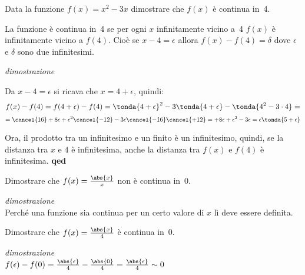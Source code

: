 \begin{esempio}
 Data la funzione \(f(x)=x^2-3x\) dimostrare che \(f(x)\) è continua in~4.
 
 La funzione è continua in~4 se per ogni \(x\) infinitamente vicino a~4 
 \(f(x)\) è infinitamente vicino a \(f(4)\). Cioè se \(x -4=\epsilon\) allora
 \(f(x) -f(4) = \delta\) dove \(\epsilon\) e \(\delta\) sono due infinitesimi.
 
\emph{dimostrazione}

Da \(x-4=\epsilon\) si ricava che \(x=4+\epsilon\), quindi: 
\[f(x) -f(4) = f(4+\epsilon) -f(4) = 
\tonda{4+\epsilon}^2-3\tonda{4+\epsilon}-\tonda{4^2-3\cdot 4}=\]
\[=\cancel{16}+8\epsilon+\epsilon^2\cancel{-12} 
  -3\epsilon\cancel{-16}\cancel{+12} = 
  +8\epsilon+\epsilon^2 -3\epsilon = 
\epsilon \tonda{5 + \epsilon}\]

Ora, il prodotto tra un infinitesimo e un finito è un infinitesimo, quindi, se 
la distanza tra \(x\) e \(4\) è infinitesima, anche la distanza tra 
\(f(x)\) e \(f(4)\) è infinitesima. \hfill \textbf{qed} 
 
\end{esempio}

\begin{esempio}
 Dimostrare che \(f(x)=\frac{\abs{x}}{x}\) non è continua in~0.
 
\emph{dimostrazione}\\
Perché una funzione sia continua per un certo valore di $x$ lì deve essere 
definita. 
\end{esempio}

\begin{esempio}
 Dimostrare che \(f(x)=\frac{\abs{x}}{4}\) è continua in~0.
 
\emph{dimostrazione}\\
\(f(\epsilon) - f(0) = \frac{\abs{\epsilon}}{4} - \frac{\abs{0}}{4} = 
 \frac{\abs{\epsilon}}{4} \sim 0\)
\end{esempio}

